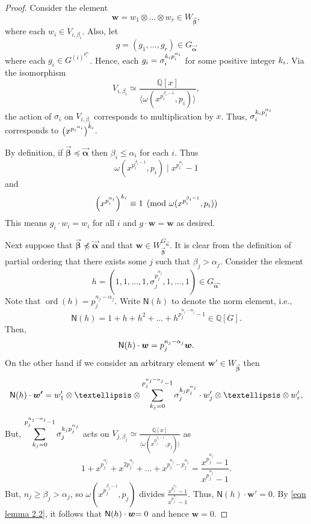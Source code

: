 \documentclass[10pt,a4paper]{amsart}
\newcommand{\Q}{\mathbb{Q}}
\newcommand{\edit}[1]{\textcolor{black}{#1}}
\newcommand{\ord}{\operatorname{ord}}
\newcommand{\val}{\vec{\boldsymbol{\alpha}}}
\newcommand{\veb}{\vec{\boldsymbol{\beta}}}
\begin{document}
\begin{proof}
Consider the element
\[
\boldsymbol{w} = w_1 \otimes \ldots \otimes w_r \in W_{\veb},
\]
where each $w_i \in V_{i, \beta_i}$.
Also, let 
\[
g = (g_1 , \ldots, g_r)\in G_{\val}
\]
where each $g_i \in G^{{(i)}^{p_i^{\alpha_i}}}$.
Hence, each $g_i = \sigma_i^{k_{\edit{i}}p_i^{\alpha_i}}$ for some positive integer $k_{\edit{i}}$.
Via the isomorphism
\[
V_{i,\beta_i} \simeq \frac{\Q[x]}{\langle \omega(x^{p_i^{\beta_i - 1}}, p_i) \rangle}, 
\]
the action of $\sigma_i$ on $V_{i,\beta_i}$ corresponds to multiplication by $x$.
Thus, $\sigma_i^{k_{\edit{i}}p_i^{\alpha_i}}$ corresponds to $\left(x^{{p_i}^{\alpha_i}}\right)^{k_{\edit{i}}}$.

By definition, if $\veb\preccurlyeq \val$ then $\beta_i \leq \alpha_i$ for each $i$.
Thus
\[
\omega(x^{p_i^{\beta_i - 1}}, p_i) \mid x^{p_i^{\alpha_i}} - 1
\]
and
\[
\left( x^{p_i^{\alpha_i}} \right)^{k_{\edit{i}} }\equiv 1 \pmod{\omega(x^{p_i^{\beta_i - 1}}, p_i)}
\]
This means $g_i \cdot w_i = w_i$ for all $i$ and $g \cdot \boldsymbol{w} = \boldsymbol{w}$ as desired.

Next suppose that $\veb\not\preccurlyeq \val$ and that $\boldsymbol{w}\in W_{\veb}^{G_{\val}}$.
It is clear from the definition of partial ordering that there exists some $j$ such that $\beta_j > \alpha_j$.
Consider the element
\[
h = (1, 1, \ldots, 1, \sigma_j^{p_j^{\alpha_j}}, 1, \ldots, 1)\in G_{\val}.
\]
Note that $\ord(h) = p_j^{n_j - \alpha_j}$.
Write $\mathsf{N}(h)$ to denote the norm element, i.e.,
\[
\mathsf{N}(h) = 1 + h + h^2 + \ldots + h^{p_j^{n_j - \alpha_j}-1} \in \Q[G].
\]
Then, 
\begin{equation}
\label{eqn lemma 2.2}
\mathsf{N}(h)\cdot \boldsymbol{w} = p_j^{n_j - \alpha_j}\boldsymbol{w} \edit{.}
\end{equation}
On the other hand if we consider \edit{an arbitrary} element $\boldsymbol{w'}\in W_{\veb}$ then
\[
\mathsf{N}(h)\cdot \boldsymbol{w'} = w'_1 \otimes \ldots \otimes \sum_{k_{\edit{j}}=0}^{p_j^{n_j - \alpha_j}-1} \sigma_j^{k_{\edit{j}} p_j^{\alpha_j}}\cdot w'_j\otimes \ldots \otimes w'_r ,
\]
But, $\displaystyle\sum_{k_{\edit{j}}=0}^{p_j^{n_j - \alpha_j}-1} \sigma_j^{k_{\edit{j}} p_j^{\alpha_j}}$ acts on $V_{j,\beta_j} \simeq \frac{\Q[x]}{\langle \omega(x^{p_j^{\beta_j - 1}}, p_j) \rangle}$ as
\[
1 + x^{p_j^{\alpha_j}} + x^{2p_j^{\alpha_j}} + \ldots + x^{p_j^{n_j} - p_j^{\alpha_j}} = \frac{x^{p_j^{n_j}}-1}{x^{p_j^{\alpha_j}}-1}.
\]
But, $n_j \geq \beta_j > \alpha_j$, so $\omega(x^{p_j^{\beta_j - 1}}, p_j)$ divides $\frac{x^{p_j^{n_j}}-1}{x^{p_j^{\alpha_j}}-1}$.
Thus, $\mathsf{N}(h)\cdot \boldsymbol{w'}=0$.
By \eqref{eqn lemma 2.2}, it follows that $\mathsf{N}(h)\cdot \boldsymbol{w}\edit{=0}$ and hence $\boldsymbol{w}=0$.
\end{proof}
\end{document}
